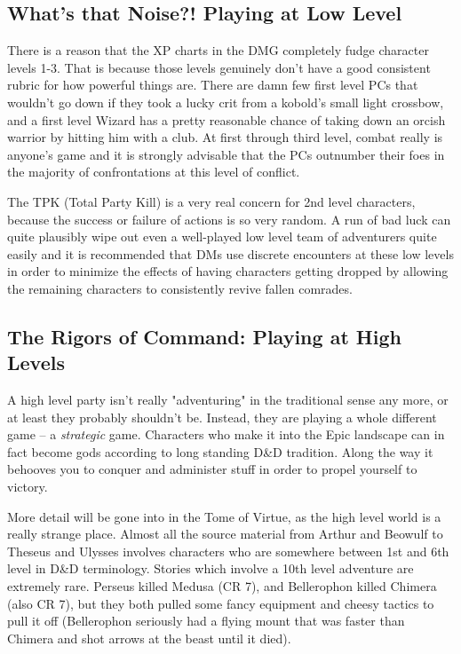 \subsection{What's that Noise?! Playing at Low Level}

There is a reason that the XP charts in the DMG completely fudge character levels 1-3. That is because those levels genuinely don't have a good consistent rubric for how powerful things are. There are damn few first level PCs that wouldn't go down if they took a lucky crit from a kobold's small light crossbow, and a first level Wizard has a pretty reasonable chance of taking down an orcish warrior by hitting him with a club. At first through third level, combat really is anyone's game and it is strongly advisable that the PCs outnumber their foes in the majority of confrontations at this level of conflict.

The TPK (Total Party Kill) is a very real concern for 2nd level characters, because the success or failure of actions is so very random. A run of bad luck can quite plausibly wipe out even a well-played low level team of adventurers quite easily and it is recommended that DMs use discrete encounters at these low levels in order to minimize the effects of having characters getting dropped by allowing the remaining characters to consistently revive fallen comrades.

\subsection{The Rigors of Command: Playing at High Levels}

A high level party isn't really "adventuring" in the traditional sense any more, or at least they probably shouldn't be. Instead, they are playing a whole different game -- a \textit{strategic} game. Characters who make it into the Epic landscape can in fact become gods according to long standing D\&D tradition. Along the way it behooves you to conquer and administer stuff in order to propel yourself to victory.

More detail will be gone into in the Tome of Virtue, as the high level world is a really strange place. Almost all the source material from Arthur and Beowulf to Theseus and Ulysses involves characters who are somewhere between 1st and 6th level in D\&D terminology. Stories which involve a 10th level adventure are extremely rare. Perseus killed Medusa (CR 7), and Bellerophon killed Chimera (also CR 7), but they both pulled some fancy equipment and cheesy tactics to pull it off (Bellerophon seriously had a flying mount that was faster than Chimera and shot arrows at the beast until it died).

